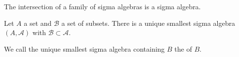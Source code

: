 \begin{prop}
  The intersection of a family of sigma algebras is
  a sigma algebra.
  \label{sigma_algebra:sigmaintersection}
\end{prop}


\begin{prop}
  Let $A$ a set and $\mathcal{B}$ a set of subsets.
  There is a unique smallest sigma algebra
  $(A, \mathcal{A})$ with
  $\mathcal{B} \subset \mathcal{A}$.
\end{prop}

We call the unique smallest sigma algebra
containing $B$ the
of $B$.
\strats
